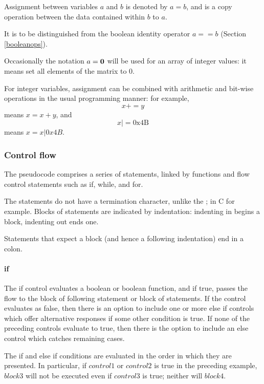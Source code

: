 Assignment between variables $a$ and $b$ is denoted by $a=b$, and is a copy
operation between the data contained within $b$ to $a$. 

It is to be distinguished from
the boolean identity operator $a==b$ (Section \ref{booleanops}).

Occasionally the notation $a={\bf 0}$ will be used for an array of integer values:
it means set all elements of the matrix to 0.

For integer variables, assignment can be combined with arithmetic and bit-wise
operations in the usual programming manner: for example, 
\[x+=y\]
means $x=x+y$, and
\[x |= \text{0x4B}\]
means $x=x|0x4B$.

\subsubsection{Control flow}
\label{controlflow}

The pseudocode comprises a series of statements, linked by functions and
flow control statements such as if, while, and for.

The statements do not have a termination character, unlike the ; in C
for example.  Blocks of statements are indicated by indentation:
indenting in begins a block, indenting out ends one.

Statements that expect a block (and hence a following indentation) end
in a colon.

\paragraph*{if}

The if control evaluates a boolean or boolean function, and if true, passes the 
flow to the block of following statement or block of statements. If the control
evaluates as false, then there is an option to include one or more else if
controls which offer alternative responses if some other condition is
true.  If none of the preceding controls evaluate to true, then there is
the option to include an else control which catches remaining cases.

\begin{pseudo*}
\bsELSE
\bsEND
\end{pseudo*}

The if and else if conditions are evaluated in the order in which they
are presented. In particular, if $control1$ or $control2$ is true in
the preceding example, $block3$ will not be executed
even if $control3$ is true; neither will $block4$.

